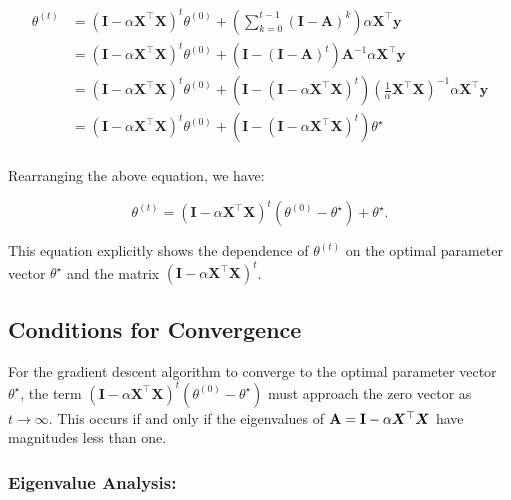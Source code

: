 \begin{align*}
    \theta^{(t)} & = (\mathbf{I} - \alpha \boldsymbol{X}^\top \boldsymbol{X})^t \theta^{(0)}  + \left( \sum_{k=0}^{t-1} (\boldsymbol{I} -  \mathbf{A})^k \right)  \alpha \boldsymbol{X} ^\top \boldsymbol{y}                                                              \\
                 & = (\mathbf{I} - \alpha \boldsymbol{X}^\top \boldsymbol{X})^t \theta^{(0)}  + (\mathbf{I}- (\mathbf{I} - \mathbf{A})^t) \mathbf{A}^{-1} \alpha \boldsymbol{X} ^\top \boldsymbol{y}                                                                      \\
                 & = (\mathbf{I} - \alpha \boldsymbol{X}^\top \boldsymbol{X})^t \theta^{(0)}  + (\mathbf{I}- (\mathbf{I} - \alpha \boldsymbol{X}^\top \boldsymbol{X})^t) \left(\frac{1}{\alpha} \bm{X}^\top \bm{X}\right)^{-1} \alpha \boldsymbol{X} ^\top \boldsymbol{y} \\
                 & = (\mathbf{I} - \alpha \boldsymbol{X}^\top \boldsymbol{X})^t \theta^{(0)}  + (\mathbf{I}- (\mathbf{I} - \alpha \boldsymbol{X}^\top \boldsymbol{X})^t) \theta^\star                                                                                     \\
\end{align*}


Rearranging the above equation, we have:

\[
    \theta^{(t)} = (\mathbf{I} - \alpha \boldsymbol{X}^\top \boldsymbol{X})^t (\theta^{(0)} - \theta^\star) + \theta^\star.
\]

This equation explicitly shows the dependence of \(\theta^{(t)}\) on the optimal parameter vector \(\theta^\star\) and the matrix \((\mathbf{I} - \alpha \boldsymbol{X}^\top \boldsymbol{X})^t\).

\subsection{Conditions for Convergence}

For the gradient descent algorithm to converge to the optimal parameter vector \(\theta^\star\), the term \((\mathbf{I} - \alpha \boldsymbol{X}^\top \boldsymbol{X})^t (\theta^{(0)} - \theta^\star)\) must approach the zero vector as \(t \to \infty\). This occurs if and only if the eigenvalues of \( \mathbf{A}=\mathbf{I} - \alpha \boldsymbol{X}^\top \boldsymbol{X}\) have magnitudes less than one.

\subsubsection{Eigenvalue Analysis:}

